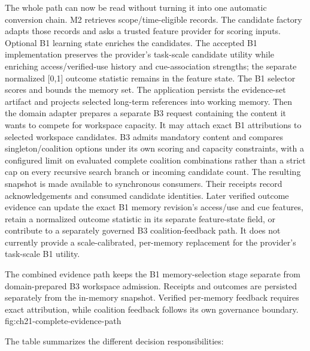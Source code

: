 The whole path can now be read without turning it into one automatic conversion chain. M2 retrieves scope/time-eligible records. The candidate factory adapts those records and asks a trusted feature provider for scoring inputs. Optional B1 learning state enriches the candidates. The accepted B1 implementation preserves the provider's task-scale candidate utility while enriching access/verified-use history and cue-association strengths; the separate normalized [0,1] outcome statistic remains in the feature state. The B1 selector scores and bounds the memory set. The application persists the evidence-set artifact and projects selected long-term references into working memory. Then the domain adapter prepares a separate B3 request containing the content it wants to compete for workspace capacity. It may attach exact B1 attributions to selected workspace candidates. B3 admits mandatory content and compares singleton/coalition options under its own scoring and capacity constraints, with a configured limit on evaluated complete coalition combinations rather than a strict cap on every recursive search branch or incoming candidate count. The resulting snapshot is made available to synchronous consumers. Their receipts record acknowledgements and consumed candidate identities. Later verified outcome evidence can update the exact B1 memory revision's access/use and cue features, retain a normalized outcome statistic in its separate feature-state field, or contribute to a separately governed B3 coalition-feedback path. It does not currently provide a scale-calibrated, per-memory replacement for the provider's task-scale B1 utility.

  {The combined evidence path keeps the B1 memory-selection stage separate from domain-prepared B3 workspace admission. Receipts and outcomes are persisted separately from the in-memory snapshot. Verified per-memory feedback requires exact attribution, while coalition feedback follows its own governance boundary.}
  {fig:ch21-complete-evidence-path}

The table summarizes the different decision responsibilities:

